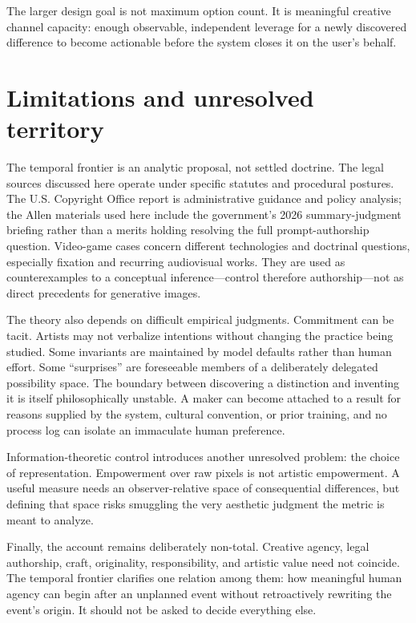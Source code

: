\documentclass[11pt]{article}
\begin{document}
The larger design goal is not maximum option count. It is meaningful creative channel capacity: enough observable, independent leverage for a newly discovered difference to become actionable before the system closes it on the user's behalf.

\section{Limitations and unresolved territory}

The temporal frontier is an analytic proposal, not settled doctrine. The legal sources discussed here operate under specific statutes and procedural postures. The U.S. Copyright Office report is administrative guidance and policy analysis; the Allen materials used here include the government's 2026 summary-judgment briefing rather than a merits holding resolving the full prompt-authorship question. Video-game cases concern different technologies and doctrinal questions, especially fixation and recurring audiovisual works. They are used as counterexamples to a conceptual inference---control therefore authorship---not as direct precedents for generative images.

The theory also depends on difficult empirical judgments. Commitment can be tacit. Artists may not verbalize intentions without changing the practice being studied. Some invariants are maintained by model defaults rather than human effort. Some ``surprises'' are foreseeable members of a deliberately delegated possibility space. The boundary between discovering a distinction and inventing it is itself philosophically unstable. A maker can become attached to a result for reasons supplied by the system, cultural convention, or prior training, and no process log can isolate an immaculate human preference.

Information-theoretic control introduces another unresolved problem: the choice of representation. Empowerment over raw pixels is not artistic empowerment. A useful measure needs an observer-relative space of consequential differences, but defining that space risks smuggling the very aesthetic judgment the metric is meant to analyze.

Finally, the account remains deliberately non-total. Creative agency, legal authorship, craft, originality, responsibility, and artistic value need not coincide. The temporal frontier clarifies one relation among them: how meaningful human agency can begin after an unplanned event without retroactively rewriting the event's origin. It should not be asked to decide everything else.
\end{document}
